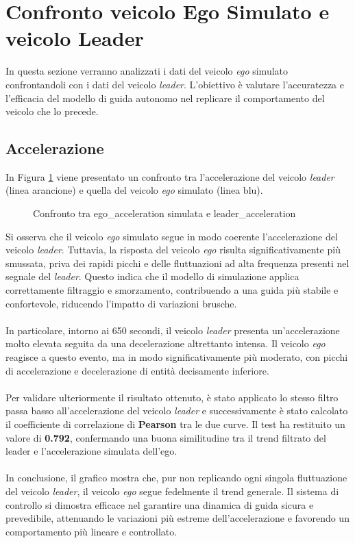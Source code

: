 \section{Confronto veicolo Ego Simulato e veicolo Leader}
In questa sezione verranno analizzati i dati del veicolo \emph{ego} simulato confrontandoli 
con i dati del veicolo \emph{leader}. L'obiettivo è valutare l'accuratezza e l'efficacia del modello di guida autonomo nel replicare 
il comportamento del veicolo che lo precede.
\subsection{Accelerazione}
In Figura \ref{fig:acc_leader_ego} viene presentato un confronto tra l'accelerazione del veicolo \emph{leader} 
(linea arancione) e quella del veicolo \emph{ego} simulato (linea blu).
\begin{figure}[H]
    \centering
    \caption{Confronto tra ego\_acceleration simulata e leader\_acceleration}
    \label{fig:acc_leader_ego}
\end{figure}
\noindent Si osserva che il veicolo \emph{ego} simulato segue in modo coerente l'accelerazione del veicolo \emph{leader}. Tuttavia, la 
risposta del veicolo \emph{ego} risulta significativamente più smussata, priva dei rapidi picchi e delle fluttuazioni ad alta frequenza 
presenti nel segnale del \emph{leader}. Questo indica che il modello di simulazione applica correttamente filtraggio e smorzamento, 
contribuendo a una guida più stabile e confortevole, riducendo l'impatto di variazioni brusche.
\\\\
\noindent In particolare, intorno ai 650 secondi, il veicolo \emph{leader} presenta un'accelerazione molto elevata seguita da una 
decelerazione altrettanto intensa. Il veicolo \emph{ego} reagisce a questo evento, ma in modo significativamente più moderato, 
con picchi di accelerazione e decelerazione di entità decisamente inferiore.
\\\\
\noindent Per validare ulteriormente il risultato ottenuto, è stato applicato lo stesso filtro passa basso all'accelerazione del veicolo 
\emph{leader} e successivamente è stato calcolato il coefficiente di correlazione di \textbf{Pearson} tra le due curve. Il test ha restituito un 
valore di \textbf{0.792}, confermando una buona similitudine tra il trend filtrato del leader e l'accelerazione simulata dell'ego.
\\\\
\noindent In conclusione, il grafico mostra che, pur non replicando ogni singola fluttuazione del veicolo \emph{leader}, 
il veicolo \emph{ego} segue fedelmente il trend generale. Il sistema di controllo si dimostra efficace nel garantire 
una dinamica di guida sicura e prevedibile, attenuando le variazioni più estreme dell'accelerazione e favorendo 
un comportamento più lineare e controllato.

